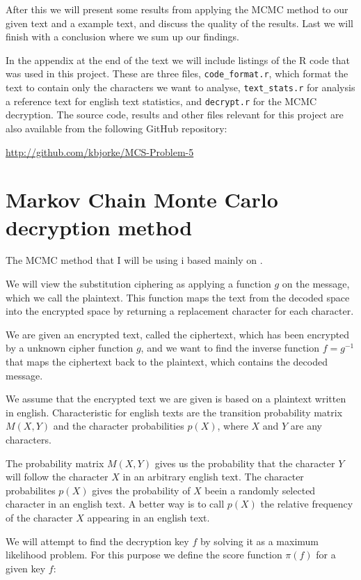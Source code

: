 \documentclass[a4paper, 11pt]{article}
\begin{document}
After this we will present some results from applying the MCMC method to
our given text and a example text, and discuss the quality of the results.
Last we will finish with a conclusion where we sum up our findings.

In the appendix at the end of the text we will include listings of the R 
code that was used in this project. These are three files, \verb+code_format.r+,
which format the text to contain only the characters we want to analyse,
\verb+text_stats.r+ for analysis a reference text for english text statistics,
and \verb+decrypt.r+ for the MCMC decryption.
The source code, results and other files relevant for this
project are also available from the following GitHub repository:

\href{http://github.com/kbjorke/MCS-Problem-5}{http://github.com/kbjorke/MCS-Problem-5}

\section{Markov Chain Monte Carlo decryption method}

The MCMC method that I will be using i based mainly on \cite{Kocmanek}.

We will view the substitution ciphering as applying a function $g$ on the
message, which we call the plaintext. This function maps the text from the
decoded space into the encrypted space by returning a replacement character
for each character.

We are given an encrypted text, called the ciphertext, which has been 
encrypted by a unknown cipher function $g$, and we want to find the 
inverse function $f = g^{-1}$ that maps the ciphertext back to the plaintext,
which contains the decoded message.

We assume that the encrypted text we are given is based on a plaintext 
written in english. Characteristic for english texts are the transition 
probability matrix $M(X,Y)$ and the character probabilities $p(X)$, where
$X$ and $Y$ are any characters.

The probability matrix $M(X,Y)$ gives us the probability that the character
$Y$ will follow the character $X$ in an arbitrary english text. The
character probabilites $p(X)$ gives the probability of $X$ beein a randomly
selected character in an english text. A better way is to call $p(X)$ the
relative frequency of the character $X$ appearing in an english text.

We will attempt to find the decryption key $f$ by solving it as a maximum
likelihood problem. For this purpose we define the score function $\pi(f)$ 
for a given key $f$:
\end{document}
